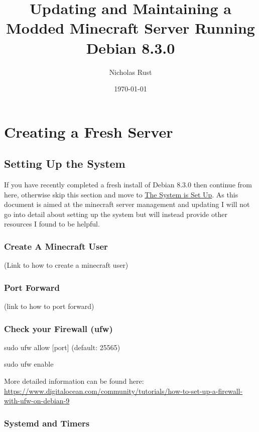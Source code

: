 \documentclass{article}
\title{Updating and Maintaining a Modded Minecraft Server Running Debian 8.3.0}
\author{Nicholas Rust}
\date{\today}
\begin{document}
\maketitle

{\hypersetup{linkcolor=black}
	\centering
	\tableofcontents
}

\pagebreak

\section{Creating a Fresh Server}

\subsection{Setting Up the System}
If you have recently completed a fresh install of Debian 8.3.0 then continue from here, otherwise skip this section and move to \hyperref[sec:NotFresh]{The System is Set Up}. As this document is aimed at the minecraft server management and updating I will not go into detail about setting up the system but will instead provide other resources I found to be helpful.

\subsubsection{Create A Minecraft User}

(Link to how to create a minecraft user)

\subsubsection{Port Forward}

(link to how to port forward)

\subsubsection{Check your Firewall (ufw)}

sudo ufw allow [port] (default: 25565)

sudo ufw enable

More detailed information can be found here:
\url{https://www.digitalocean.com/community/tutorials/how-to-set-up-a-firewall-with-ufw-on-debian-9}

\subsubsection{Systemd and Timers}
\end{document}
